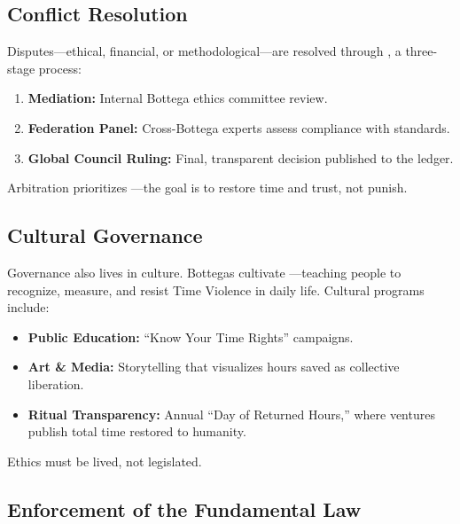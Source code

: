 \subsection{Conflict Resolution}
\label{sec:conflict-resolution}

Disputes—ethical, financial, or methodological—are resolved through , a three-stage process:

\begin{enumerate}
    \item \textbf{Mediation:} Internal Bottega ethics committee review.
    \item \textbf{Federation Panel:} Cross-Bottega experts assess compliance with standards.
    \item \textbf{Global Council Ruling:} Final, transparent decision published to the ledger.
\end{enumerate}

Arbitration prioritizes —the goal is to restore time and trust, not punish.

\subsection{Cultural Governance}
\label{sec:cultural-governance}

Governance also lives in culture. Bottegas cultivate —teaching people to recognize, measure, and resist Time Violence in daily life. Cultural programs include:

\begin{itemize}
    \item \textbf{Public Education:} ``Know Your Time Rights'' campaigns.
    \item \textbf{Art \& Media:} Storytelling that visualizes hours saved as collective liberation.
    \item \textbf{Ritual Transparency:} Annual ``Day of Returned Hours,'' where ventures publish total time restored to humanity.
\end{itemize}

Ethics must be lived, not legislated.

\subsection{Enforcement of the Fundamental Law}
\label{sec:fundamental-law}

